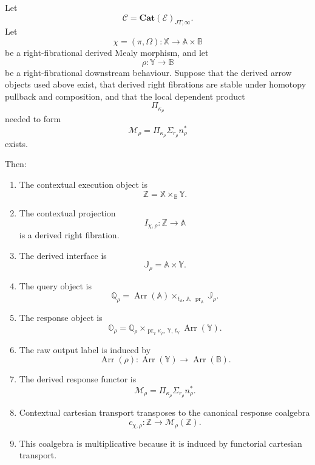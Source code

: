 \begin{theorem}
\label{thm:derived-poly-main-consolidation}
Let
\[
\mathcal C
=
\mathbf{Cat}(\mathcal E)_{JT,\infty}.
\]
Let
\[
\chi=(\pi,\Omega):\mathbb X\to\mathbb A\times\mathbb B
\]
be a right-fibrational derived Mealy morphism, and let
\[
\rho:\mathbb Y\to\mathbb B
\]
be a right-fibrational downstream behaviour.  Suppose that the derived arrow
objects used above exist, that derived right fibrations are stable under
homotopy pullback and composition, and that the local dependent product
\[
\Pi_{\kappa_\rho}
\]
needed to form
\[
\mathcal M_\rho
=
\Pi_{\kappa_\rho}\Sigma_{r_\rho}n_\rho^\ast
\]
exists.

Then:

\begin{enumerate}
\item The contextual execution object is
\[
\mathbb Z=\mathbb X\times_{\mathbb B}\mathbb Y.
\]

\item The contextual projection
\[
I_{\chi,\rho}:\mathbb Z\to\mathbb A
\]
is a derived right fibration.

\item The derived interface is
\[
\mathbb J_\rho=\mathbb A\times\mathbb Y.
\]

\item The query object is
\[
\mathbb Q_\rho
=
\operatorname{Arr}(\mathbb A)
\times_{t_{\mathbb A},\,\mathbb A,\,\operatorname{pr}_{\mathbb A}}
\mathbb J_\rho.
\]

\item The response object is
\[
\mathbb O_\rho
=
\mathbb Q_\rho
\times_{\operatorname{pr}_{\mathbb Y}\kappa_\rho,\,\mathbb Y,\,t_{\mathbb Y}}
\operatorname{Arr}(\mathbb Y).
\]

\item The raw output label is induced by
\[
\operatorname{Arr}(\rho):
\operatorname{Arr}(\mathbb Y)\to\operatorname{Arr}(\mathbb B).
\]

\item The derived response functor is
\[
\mathcal M_\rho
=
\Pi_{\kappa_\rho}\Sigma_{r_\rho}n_\rho^\ast.
\]

\item Contextual cartesian transport transposes to the canonical response
coalgebra
\[
c_{\chi,\rho}:\mathbb Z\to\mathcal M_\rho(\mathbb Z).
\]

\item This coalgebra is multiplicative because it is induced by functorial
cartesian transport.


\end{enumerate}
\end{theorem}

